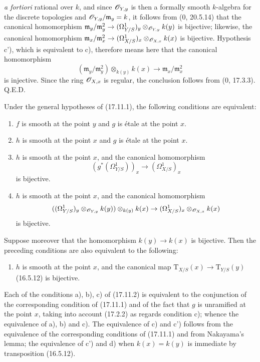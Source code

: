 
\emph{a fortiori} rational over $k$, and since $\mathscr{O}_{Y,y}$ is then a formally smooth $k$-algebra for the discrete topologies and $\mathscr{O}_{Y,y}/\mathfrak m_y=k$, it follows from (0, 20.5.14) that the canonical homomorphism $\mathfrak m_y/\mathfrak m_y^2\to(\Omega^1_{Y/S})_y\otimes_{\mathscr{O}_{Y,y}}k(y)$ is bijective; likewise, the canonical homomorphism $\mathfrak m_x/\mathfrak m_x^2\to(\Omega^1_{X/S})_x\otimes_{\mathscr{O}_{X,x}}k(x)$ is bijective. Hypothesis c'), which is equivalent to c), therefore means here that the canonical homomorphism
\[
(\mathfrak m_y/\mathfrak m_y^2)\otimes_{k(y)}k(x)\to\mathfrak m_x/\mathfrak m_x^2
\]
is injective. Since the ring $\mathscr{O}_{X,x}$ is regular, the conclusion follows from (0, 17.3.3). Q.E.D.

\begin{corollary}[17.11.2]
\label{IV.17.11.2}
Under the general hypotheses of (17.11.1), the following conditions are equivalent:
\begin{enumerate}
  \item[a)] $f$ is smooth at the point $y$ and $g$ is étale at the point $x$.
  \item[b)] $h$ is smooth at the point $x$ and $g$ is étale at the point $x$.
  \item[c)] $h$ is smooth at the point $x$, and the canonical homomorphism
  \[
  (g^*(\Omega^1_{Y/S}))_x\to(\Omega^1_{X/S})_x
  \]
  is bijective.
  \item[c')] $h$ is smooth at the point $x$, and the canonical homomorphism
  \[
  ((\Omega^1_{Y/S})_y\otimes_{\mathscr{O}_{Y,y}}k(y))\otimes_{k(y)}k(x)\to(\Omega^1_{X/S})_x\otimes_{\mathscr{O}_{X,x}}k(x)
  \]
  is bijective.
\end{enumerate}
Suppose moreover that the homomorphism $k(y)\to k(x)$ is bijective. Then the preceding conditions are also equivalent to the following:
\begin{enumerate}
  \item[d)] $h$ is smooth at the point $x$, and the canonical map $\mathrm{T}_{X/S}(x)\to\mathrm{T}_{Y/S}(y)$ (16.5.12) is bijective.
\end{enumerate}
\end{corollary}

Each of the conditions a), b), c) of (17.11.2) is equivalent to the conjunction of the corresponding condition of (17.11.1) and of the fact that $g$ is unramified at the point $x$, taking into account (17.2.2) as regards condition c); whence the equivalence of a), b) and c). The equivalence of c) and c') follows from the equivalence of the corresponding conditions of (17.11.1) and from Nakayama's lemma; the equivalence of c') and d) when $k(x)=k(y)$ is immediate by transposition (16.5.12).

